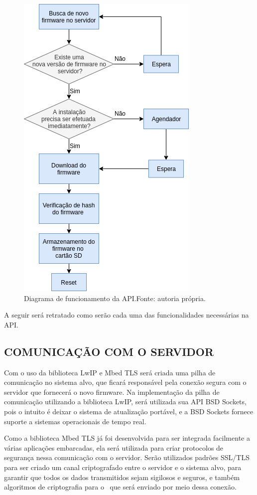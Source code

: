 \begin{figure}[H]
    \scriptsize
     \centering
     \includegraphics[scale=0.9]{dados/figuras/DiagAPI.png}
     \caption{Diagrama de funcionamento da API.\newline Fonte: autoria própria.}
     \label{fig:DiagAPI}
\end{figure}

A seguir será retratado como serão cada uma das funcionalidades necessárias na API.

\subsection{COMUNICAÇÃO COM O SERVIDOR}

Com o uso da biblioteca LwIP e Mbed TLS será criada uma pilha de comunicação no sistema alvo, que ficará responsável pela conexão segura com o servidor que fornecerá o novo firmware. Na implementação da pilha de comunicação utilizando a  biblioteca LwIP, será utilizada sua API BSD Sockets, pois o intuito é deixar o sistema de atualização portável, e a BSD Sockets fornece suporte a sistemas operacionais de tempo real.

Como a biblioteca Mbed TLS já foi desenvolvida para ser integrada facilmente a várias aplicações embarcadas, ela será utilizada para criar protocolos de segurança nessa comunicação com o servidor. Serão utilizados padrões SSL/TLS para ser criado um canal criptografado entre o servidor e o sistema alvo, para garantir que todos os dados transmitidos sejam sigilosos e seguros, e também algoritmos de criptografia para o \firmware\ que será enviado por meio dessa conexão.

